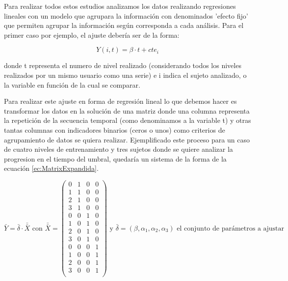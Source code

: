 \documentclass{article}
\begin{document}
    Para realizar todos estos estudios analizamos los datos realizando regresiones lineales con un modelo que agrupara la información con denominados 'efecto fijo' que permiten agrupar la información según corresponda a cada análisis. Para el primer caso por ejemplo, el ajuste debería ser de la forma:
    
    \begin{equation} \label{ec:RegresionEntrenamiento1}
        Y(i,t) = \beta \cdot t + cte_i
    \end{equation}
    
    donde t representa el numero de nivel realizado (considerando todos los niveles realizados por un mismo usuario como una serie) e i indica el sujeto analizado, o la variable en función de la cual se comparar.

    Para realizar este ajuste en forma de regresión lineal lo que debemos hacer es transformar los datos en la solución de una matriz donde una columna representa la repetición de la secuencia temporal (como denominamos a la variable t) y otras tantas columnas con indicadores binarios (ceros o unos) como criterios de agrupamiento de datos se quiera realizar. Ejemplificado este proceso para un caso de cuatro niveles de entrenamiento y tres sujetos donde se quiere analizar la progresion en el tiempo del umbral, quedaría un sistema de la forma de la ecuación \ref{ec:MatrixExpandida}.

    \begin{equation} \label{ec:MatrixExpandida}
    \bar {Y} = \bar{\delta} \cdot \bar{\bar{X}} \text{ con } \bar{\bar{X}} =
     \begin{pmatrix}
        0 & 1 & 0 & 0\\
        1 & 1 & 0 & 0\\
        2 & 1 & 0 & 0\\
        3 & 1 & 0 & 0\\
        0 & 0 & 1 & 0\\
        1 & 0 & 1 & 0\\
        2 & 0 & 1 & 0\\
        3 & 0 & 1 & 0\\
        0 & 0 & 0 & 1\\
        1 & 0 & 0 & 1\\
        2 & 0 & 0 & 1\\
        3 & 0 & 0 & 1\\
     \end{pmatrix} \text{ y $\bar{\delta}=(\beta,\alpha_1,\alpha_2,\alpha_3)$ el conjunto de parámetros a ajustar}
 \end{equation}
 
\end{document}
